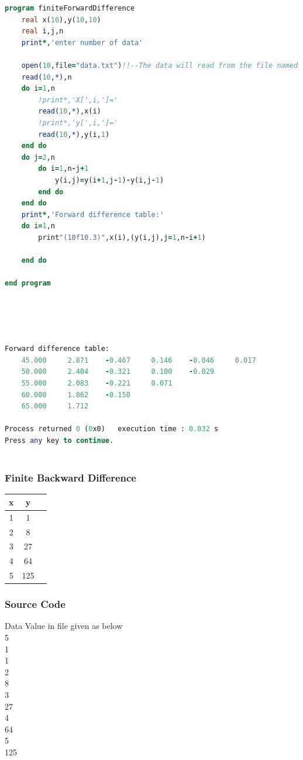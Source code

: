 \documentclass{article}
\begin{document}
\begin{lstlisting}[language=Fortran,caption=Finite Forward Difference]
program finiteForwardDifference
    real x(10),y(10,10)
    real i,j,n
    print*,'enter number of data'

    open(10,file="data.txt")!!--The data will read from the file named data--!!
    read(10,*),n
    do i=1,n
        !print*,'X[',i,']='
        read(10,*),x(i)
        !print*,'y[',i,']='
        read(10,*),y(i,1)
    end do
    do j=2,n
        do i=1,n-j+1
            y(i,j)=y(i+1,j-1)-y(i,j-1)
        end do
    end do
    print*,'Forward difference table:'
    do i=1,n
        print"(10f10.3)",x(i),(y(i,j),j=1,n-i+1)

    end do

end program






\end{lstlisting}
\begin{lstlisting}[language=Fortran,caption=Finite Forward Difference Output]
 Forward difference table:
    45.000     2.871    -0.467     0.146    -0.046     0.017
    50.000     2.404    -0.321     0.100    -0.029
    55.000     2.083    -0.221     0.071
    60.000     1.862    -0.150
    65.000     1.712

Process returned 0 (0x0)   execution time : 0.032 s
Press any key to continue.
 
\end{lstlisting}
\subsubsection{Finite Backward Difference}
\begin{center}
\begin{tabular}{ |c|c|c| } 
\hline
 x & y\\
\hline
 1 & 1  \\  \hline
 2 & 8  \\  \hline
 3 & 27 \\  \hline
 4 & 64  \\  \hline
 5 & 125  \\  \hline
 
 \hline
\end{tabular}
\end{center}
\subsubsection{Source Code}
Data Value in file given as below\\
5\\
1\\
1\\
2\\
8\\
3\\
27\\
4\\
64\\
5\\
125\\
\end{document}
